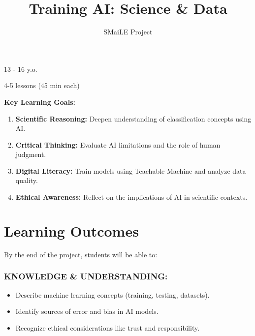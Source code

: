 \documentclass[11pt, a4paper]{article}
\begin{document}
\title{\textbf{\color{SmaileOrange}Training AI: Science \& Data}}
\author{SMaiLE Project}
\date{}
\maketitle
\thispagestyle{plain}

\begin{keyinfobox}
    \begin{description}[leftmargin=*, labelindent=0pt]
        \item[\bfseries\color{SmaileOrange} Target Group:] 13 - 16 y.o.
        \item[\bfseries\color{SmaileOrange} Duration:] 4-5 lessons (45 min each)
    \end{description}
    \textbf{Key Learning Goals:}
    \begin{enumerate}
        \item \textbf{Scientific Reasoning:} Deepen understanding of classification concepts using AI.
        \item \textbf{Critical Thinking:} Evaluate AI limitations and the role of human judgment.
        \item \textbf{Digital Literacy:} Train models using Teachable Machine and analyze data quality.
        \item \textbf{Ethical Awareness:} Reflect on the implications of AI in scientific contexts.
    \end{enumerate}
\end{keyinfobox}

\section*{Learning Outcomes}
By the end of the project, students will be able to:

\subsubsection*{KNOWLEDGE \& UNDERSTANDING:}
\begin{itemize}
    \item Describe machine learning concepts (training, testing, datasets).
    \item Identify sources of error and bias in AI models.
    \item Recognize ethical considerations like trust and responsibility.
\end{itemize}
\end{document}
